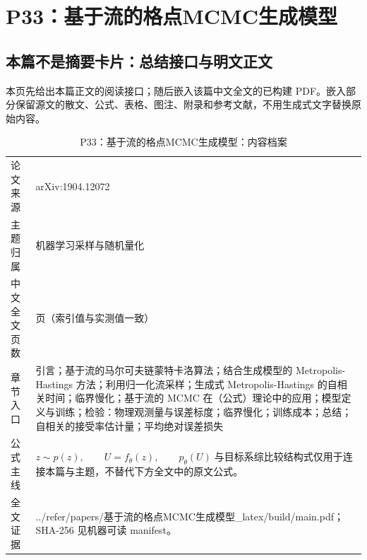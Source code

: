 \documentclass[UTF8,11pt,oneside]{ctexbook}
\begin{document}
\chapter{P33：基于流的格点MCMC生成模型}
\section*{本篇不是摘要卡片：总结接口与明文正文}
本页先给出本篇正文的阅读接口；随后嵌入该篇中文全文的已构建 PDF。嵌入部分保留源文的散文、公式、表格、图注、附录和参考文献，不用生成式文字替换原始内容。
\begin{table}[htbp]
  \centering
  \caption{P33：基于流的格点MCMC生成模型：内容档案}
  \small
  \begin{tabularx}{0.96\textwidth}{@{}p{3.3cm}>{\raggedright\arraybackslash}X@{}}
    \toprule
    论文来源 & arXiv:1904.12072 \\
    主题归属 & 机器学习采样与随机量化 \\
    中文全文页数 & 17 页（索引值与实测值一致） \\
    章节入口 & 引言；基于流的马尔可夫链蒙特卡洛算法；结合生成模型的 Metropolis-Hastings 方法；利用归一化流采样；生成式 Metropolis-Hastings 的自相关时间；临界慢化；基于流的 MCMC 在（公式）理论中的应用；模型定义与训练；检验：物理观测量与误差标度；临界慢化；训练成本；总结；自相关的接受率估计量；平均绝对误差损失 \\
    公式主线 & $z\sim p(z),\qquad U=f_\theta(z),\qquad p_\theta(U)\;\text{与目标系综比较}$\newline\scriptsize 结构式仅用于连接本篇与主题，不替代下方全文中的原文公式。 \\
    全文证据 & ../\allowbreak{}refer/\allowbreak{}papers/\allowbreak{}基于流的格点MCMC生成模型\_\allowbreak{}latex/\allowbreak{}build/\allowbreak{}main.pdf；SHA-256 见机器可读 manifest。 \\
    \bottomrule
  \end{tabularx}
\end{table}
\end{document}
